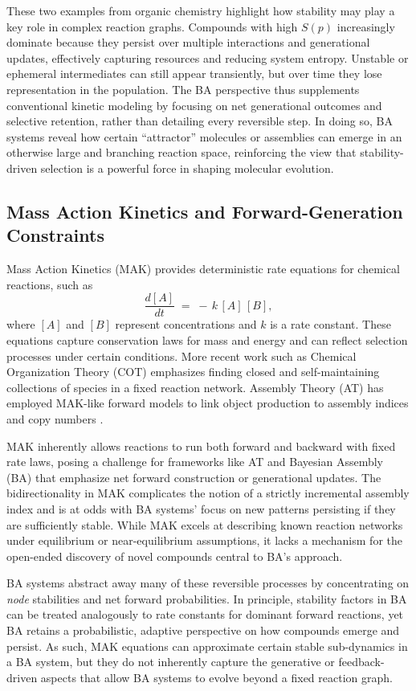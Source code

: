 \documentclass[entropy,article,submit,pdftex,moreauthors]{Definitions/mdpi}
\begin{document}
These two examples from organic chemistry highlight how stability may play a key role in complex reaction graphs. Compounds with high $S(p)$ increasingly dominate because they persist over multiple interactions and generational updates, effectively capturing resources and reducing system entropy. Unstable or ephemeral intermediates can still appear transiently, but over time they lose representation in the population. The BA perspective thus supplements conventional kinetic modeling by focusing on net generational outcomes and selective retention, rather than detailing every reversible step. In doing so, BA systems reveal how certain ``attractor'' molecules or assemblies can emerge in an otherwise large and branching reaction space, reinforcing the view that stability-driven selection is a powerful force in shaping molecular evolution.

\subsection{Mass Action Kinetics and Forward-Generation Constraints}
\label{subsec:mak-forward-limitations}

Mass Action Kinetics (MAK) \cite{TuranyiTomlin2014} provides deterministic rate equations for chemical reactions, such as
\[
\frac{d[A]}{dt} \;=\; -\,k\, [A]\,[B],
\]
where $[A]$ and $[B]$ represent concentrations and $k$ is a rate constant. These equations capture conservation laws for mass and energy and can reflect selection processes under certain conditions. More recent work such as Chemical Organization Theory (COT) \cite{DittrichFenizio2005} emphasizes finding closed and self-maintaining collections of species in a fixed reaction network. Assembly Theory (AT) has employed MAK-like forward models to link object production to assembly indices and copy numbers \cite{walker2023nature}.

MAK inherently allows reactions to run both forward and backward with fixed rate laws, posing a challenge for frameworks like AT and Bayesian Assembly (BA) that emphasize net forward construction or generational updates. The bidirectionality in MAK complicates the notion of a strictly incremental assembly index and is at odds with BA systems’ focus on new patterns persisting if they are sufficiently stable. While MAK excels at describing known reaction networks under equilibrium or near-equilibrium assumptions, it lacks a mechanism for the open-ended discovery of novel compounds central to BA’s approach.


BA systems abstract away many of these reversible processes by concentrating on \emph{node} stabilities and net forward probabilities. In principle, stability factors in BA can be treated analogously to rate constants for dominant forward reactions, yet BA retains a probabilistic, adaptive perspective on how compounds emerge and persist. As such, MAK equations can approximate certain stable sub-dynamics in a BA system, but they do not inherently capture the generative or feedback-driven aspects that allow BA systems to evolve beyond a fixed reaction graph. 
\end{document}

